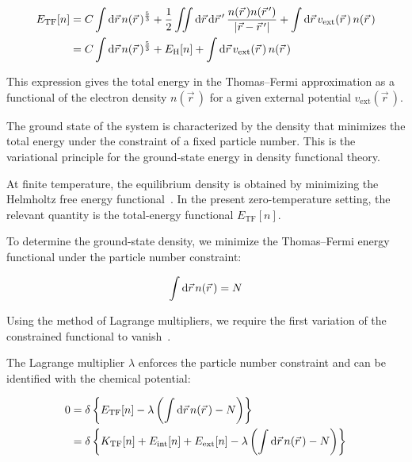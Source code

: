 \begin{equation}
\begin{aligned}
    E_\mathrm{TF}[n]
    &= C\int\mathrm{d}{\vec{r}}\,n(\vec{r}\,)^{\frac{5}{3}}
    + \frac{1}{2}\iint\mathrm{d}{\vec{r}}\,\mathrm{d}{\vec{r}\,'}\,\frac{n(\vec{r}\,)n(\vec{r}\,')}{|\vec{r}-\vec{r}\,'|}
    + \int\mathrm{d}{\vec{r}}\,v_\mathrm{ext}(\vec{r}\,)\,n(\vec{r}\,) \\
    &= C\int\mathrm{d}{\vec{r}}\,n(\vec{r}\,)^{\frac{5}{3}}
    + E_\mathrm{H}[n] + \int\mathrm{d}{\vec{r}}\,v_\mathrm{ext}(\vec{r}\,)\,n(\vec{r}\,)
\end{aligned}
\label{full_energy_functional}
\end{equation}

This expression gives the total energy in the Thomas--Fermi approximation as a functional of the electron density $n(\vec{r}\,)$ for a given external potential $v_\mathrm{ext}(\vec{r}\,)$.

The ground state of the system is characterized by the density that minimizes the total energy under the constraint of a fixed particle number.
This is the variational principle for the ground-state energy in density functional theory.

At finite temperature, the equilibrium density is obtained by minimizing the Helmholtz free energy functional~\cite{mermin1965thermal}.
In the present zero-temperature setting, the relevant quantity is the total-energy functional $E_\mathrm{TF}[n]$.

To determine the ground-state density, we minimize the Thomas--Fermi energy functional under the particle number constraint:

\begin{equation}
    \int\mathrm{d}{\vec{r}}\,n(\vec{r}\,)=N
\label{constraint_particle_number}
\end{equation}

Using the method of Lagrange multipliers, we require the first variation of the constrained functional to vanish~\cite{gelfand1963calculus}.

The Lagrange multiplier $\lambda$ enforces the particle number constraint and can be identified with the chemical potential:

\begin{equation}
\begin{aligned}
    0 &= \delta\left\{E_\mathrm{TF}[n]-\lambda\left(\int\mathrm{d}{\vec{r}}\,n(\vec{r}\,)-N\right)\right\}\\
    &= \delta\left\{K_\mathrm{TF}[n]+E_\mathrm{int}[n]+E_\mathrm{ext}[n]-\lambda\left(\int\mathrm{d}{\vec{r}}\,n(\vec{r}\,)-N\right)\right\}
\end{aligned}
\label{total_energy_variation}
\end{equation}

